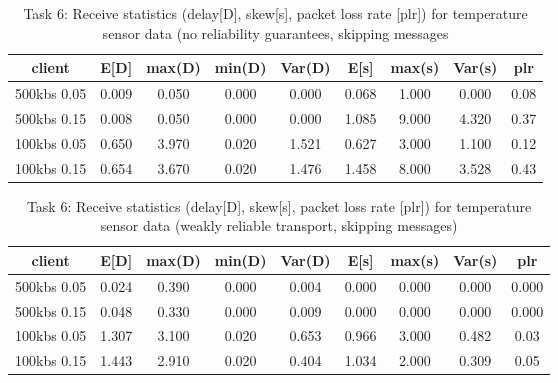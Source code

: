\begin{table}
\centering
\begin{tabular}{|c|c|c|c|c|c|c|c|c|}
\hline
client      & E[D]  & max(D) & min(D) & Var(D) & E[s] & max(s) & Var(s) & plr\\
\hline
500kbs 0.05 & 0.009 & 0.050 & 0.000 & 0.000 & 0.068 & 1.000 & 0.000 & 0.08 \\
\hline
500kbs 0.15 & 0.008 & 0.050 & 0.000 & 0.000 & 1.085 & 9.000 & 4.320 & 0.37\\
\hline
100kbs 0.05 & 0.650 & 3.970 & 0.020 & 1.521 & 0.627 & 3.000 & 1.100 & 0.12\\
\hline
100kbs 0.15 & 0.654 & 3.670 & 0.020 & 1.476 & 1.458 & 8.000& 3.528 & 0.43\\
\hline
\end{tabular}
\caption{Task 6: Receive statistics (delay[D], skew[s], packet loss rate [plr]) for temperature sensor data (no reliability guarantees, skipping messages}
\label{table:task6-tmp-c}
\end{table}

\begin{table}
\centering
\begin{tabular}{|c|c|c|c|c|c|c|c|c|}
\hline
client & E[D] & max(D) & min(D) & Var(D) & E[s] & max(s) & Var(s) & plr\\
\hline
500kbs 0.05 & 0.024 & 0.390 & 0.000 & 0.004 & 0.000 & 0.000 & 0.000 & 0.000 \\
\hline
500kbs 0.15 & 0.048 & 0.330 & 0.000 & 0.009 & 0.000 & 0.000 & 0.000 & 0.000 \\
\hline
100kbs 0.05 & 1.307 & 3.100 & 0.020 & 0.653 & 0.966 & 3.000 & 0.482 & 0.03\\
\hline
100kbs 0.15 & 1.443 & 2.910 & 0.020 & 0.404 & 1.034 & 2.000 & 0.309 & 0.05\\
\hline
\end{tabular}
\caption{Task 6: Receive statistics (delay[D], skew[s], packet loss rate [plr]) for temperature sensor data (weakly reliable transport, skipping messages)}
\label{table:task6-temp-e}
\end{table}


